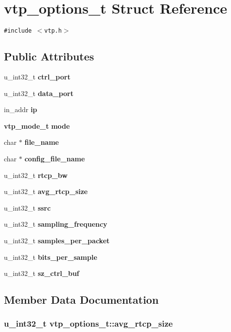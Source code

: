 \section{vtp\_\-options\_\-t Struct Reference}
\label{structvtp__options__t}
{\tt \#include $<$vtp.h$>$}

\subsection*{Public Attributes}
\begin{CompactItemize}
\item 
u\_\-int32\_\-t {\bf ctrl\_\-port}
\item 
u\_\-int32\_\-t {\bf data\_\-port}
\item 
in\_\-addr {\bf ip}
\item 
{\bf vtp\_\-mode\_\-t} {\bf mode}
\item 
char $\ast$ {\bf file\_\-name}
\item 
char $\ast$ {\bf config\_\-file\_\-name}
\item 
u\_\-int32\_\-t {\bf rtcp\_\-bw}
\item 
u\_\-int32\_\-t {\bf avg\_\-rtcp\_\-size}
\item 
u\_\-int32\_\-t {\bf ssrc}
\item 
u\_\-int32\_\-t {\bf sampling\_\-frequency}
\item 
u\_\-int32\_\-t {\bf samples\_\-per\_\-packet}
\item 
u\_\-int32\_\-t {\bf bits\_\-per\_\-sample}
\item 
u\_\-int32\_\-t {\bf sz\_\-ctrl\_\-buf}
\end{CompactItemize}


\subsection{Member Data Documentation}
\subsubsection{\setlength{\rightskip}{0pt plus 5cm}u\_\-int32\_\-t {\bf vtp\_\-options\_\-t::avg\_\-rtcp\_\-size}}\label{structvtp__options__t_o7}


